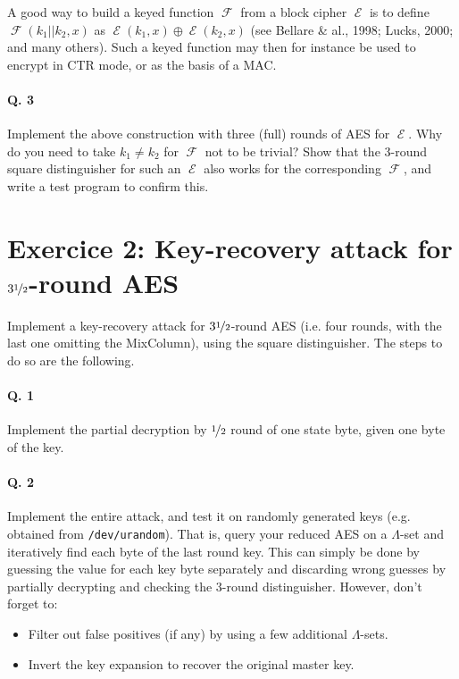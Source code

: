 \documentclass[a4paper,11pt]{article}
\DeclareMathOperator\prf{\mathcal{F}}
\DeclareMathOperator\prp{\mathcal{E}}
\begin{document}
\bigskip

A good way to build a keyed function $\prf$ from a block cipher $\prp$ is to define $\prf(k_1||k_2, x)$ as $\prp(k_1, x) \oplus \prp(k_2, x)$
(see Bellare \& al., 1998; Lucks, 2000; and many others).
Such a keyed function may then for instance be used to encrypt in CTR mode, or as the basis of a MAC.

\smallskip

\paragraph*{Q. 3} Implement the above construction with three (full) rounds of AES for $\prp$. Why do you need to take $k_1 \neq k_2$ for
$\prf$ not to be trivial?
Show that the 3-round square distinguisher
for such an $\prp$ also works for the corresponding $\prf$, and write a test program to confirm this. 

\section*{Exercice 2: Key-recovery attack for $3\nicefrac{1}{2}$-round AES}

Implement a key-recovery attack for $3\nicefrac{1}{2}$-round AES (i.e. four rounds, with the last one omitting the MixColumn), using the square distinguisher.
The steps to do so are the following.

\paragraph*{Q. 1} Implement the partial decryption by $\nicefrac{1}{2}$ round of one state byte, given one byte of the key.

\paragraph*{Q. 2} Implement the entire attack, and test it on randomly generated keys (e.g. obtained from \texttt{/dev/urandom}). That is, query
your reduced AES on a $\Lambda$-set and iteratively find each byte of the last round key. This can simply be done by guessing the value for each key
byte separately and discarding wrong guesses by partially decrypting and checking the 3-round distinguisher. However, don't forget to:
\begin{itemize}
\item Filter out false positives (if any) by using a few additional $\Lambda$-sets.
\item Invert the key expansion to recover the original master key.
\end{itemize} 
\end{document}
